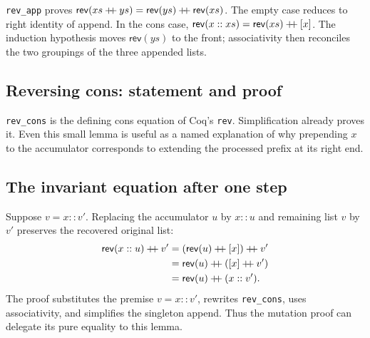\documentclass[11pt]{article}
\begin{document}
\begin{minipage}{\linewidth}

\end{minipage}

\texttt{rev\_app} proves
\(\mathsf{rev}(xs\mathbin{+\mkern-6mu+}ys)=
\mathsf{rev}(ys)\mathbin{+\mkern-6mu+}\mathsf{rev}(xs)\).
The empty case reduces to right identity of append. In the cons case,
\(\mathsf{rev}(x::xs)=\mathsf{rev}(xs)\mathbin{+\mkern-6mu+}[x]\).
The induction hypothesis moves \(\mathsf{rev}(ys)\) to the front; associativity
then reconciles the two groupings of the three appended lists.

\subsection{Reversing cons: statement and proof}

\begin{minipage}{\linewidth}

\end{minipage}

\texttt{rev\_cons} is the defining cons equation of Coq's \texttt{rev}.
Simplification already proves it. Even this small lemma is useful as a named
explanation of why prepending \(x\) to the accumulator corresponds to extending
the processed prefix at its right end.

\subsection{The invariant equation after one step}

\begin{minipage}{\linewidth}

\end{minipage}

Suppose \(v=x::v'\). Replacing the accumulator \(u\) by \(x::u\) and
remaining list \(v\) by \(v'\) preserves the recovered original list:
\[
\begin{aligned}
\mathsf{rev}(x::u)\mathbin{+\mkern-6mu+}v'
 &= (\mathsf{rev}(u)\mathbin{+\mkern-6mu+}[x])
       \mathbin{+\mkern-6mu+}v'\\
 &= \mathsf{rev}(u)\mathbin{+\mkern-6mu+}([x]\mathbin{+\mkern-6mu+}v')\\
 &= \mathsf{rev}(u)\mathbin{+\mkern-6mu+}(x::v').
\end{aligned}
\]
The proof substitutes the premise \(v=x::v'\), rewrites \texttt{rev\_cons},
uses associativity, and simplifies the singleton append. Thus the mutation
proof can delegate its pure equality to this lemma.
\end{document}
